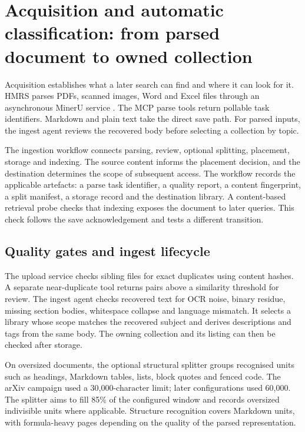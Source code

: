\section{Acquisition and automatic classification: from parsed document to
owned collection}
\label{sec:acquisition}

Acquisition establishes what a later search can find and where it can
look for it. HMRS parses PDFs, scanned images, Word and Excel files through
an asynchronous MinerU service \citep{mineru}. The MCP parse tools return
pollable task identifiers. Markdown and plain text take the direct save
path. For parsed inputs, the ingest agent reviews the recovered body before
selecting a collection by topic.

The ingestion workflow connects parsing, review, optional splitting,
placement, storage and indexing. The source content informs the placement
decision, and the destination determines the scope of subsequent access.
The workflow records the applicable artefacts: a parse task identifier,
a quality report, a content fingerprint, a split manifest, a storage
record and the destination library. A content-based retrieval probe checks
that indexing exposes the document to later queries. This check follows the
save acknowledgement and tests a different transition.

\subsection{Quality gates and ingest lifecycle}

The upload service checks sibling files for exact duplicates using content
hashes. A separate near-duplicate tool returns pairs above a similarity
threshold for review. The ingest agent checks recovered text for OCR noise,
binary residue, missing section bodies, whitespace collapse and language
mismatch. It selects a library whose scope matches the recovered subject and
derives descriptions and tags from the same body. The owning collection and
its listing can then be checked after storage.

On oversized documents, the optional structural splitter groups recognised
units such as headings, Markdown tables, lists, block quotes and fenced code.
The arXiv campaign used a 30,000-character limit; later configurations used
60,000. The splitter aims to fill 85\% of the configured window and records
oversized indivisible units where applicable. Structure recognition covers
Markdown units, with formula-heavy pages depending on the quality of the
parsed representation.

